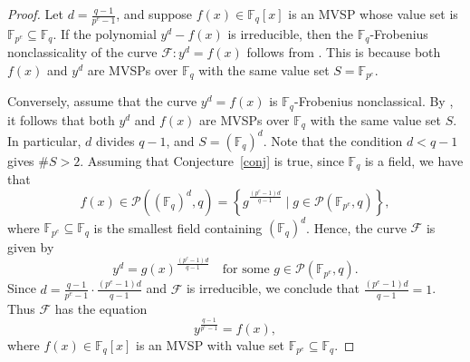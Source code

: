 \documentclass[11pt]{amsart}
\theoremstyle{definition}
\theoremstyle{remark}
\begin{document}
\begin{proof}

Let \( d = \frac{q - 1}{p^e - 1} \), and suppose \( f(x) \in \mathbb{F}_{q}[x] \) is an MVSP whose value set is \( \mathbb{F}_{p^e}     \subseteq  \mathbb{F}_{q} \). If the polynomial \( y^d - f(x) \) is irreducible, then the \(\mathbb{F}_{q}\)-Frobenius nonclassicality of the curve \( \mathcal{F}: y^d = f(x) \) follows from \cite[Corollary 3.5]{Bor0}. This is because both \( f(x) \) and \( y^d \) are MVSPs over \( \mathbb{F}_{q} \) with the same value set \( S = \mathbb{F}_{p^e} \).

Conversely, assume that the curve \( y^d = f(x) \) is \(\mathbb{F}_{q}\)-Frobenius nonclassical. By \cite[Corollary 3.5]{Bor0}, it follows that both \( y^d \) and \( f(x) \) are MVSPs over \( \mathbb{F}_{q} \) with the same value set \( S \). In particular,  \( d \) divides \( q - 1 \), and \( S = \left( \mathbb{F}_{q} \right)^d \). Note that the condition $d<q-1$ gives $\#S>2$. Assuming that Conjecture~\ref{conj} is true,  since \( \mathbb{F}_{q} \) is a field, we have that
\[
f(x) \in \mathcal{P}\left( \left( \mathbb{F}_{q} \right)^d, q \right) = \left\{ g^{\frac{\left( p^e - 1 \right) d}{q - 1}} \mid g \in \mathcal{P}\left( \mathbb{F}_{p^e}, q \right) \right\},
\]
where \( \mathbb{F}_{p^e} \subseteq \mathbb{F}_{q} \) is the smallest field containing \( \left( \mathbb{F}_{q} \right)^d \). Hence, the curve \( \mathcal{F} \) is given by
\[
y^d = g(x)^{\frac{\left( p^e - 1 \right) d}{q - 1}}  \quad \text{for some } g \in \mathcal{P}\left( \mathbb{F}_{p^e}, q \right).
\]
Since \( d = \frac{q - 1}{p^e - 1} \cdot \frac{\left( p^e - 1 \right) d}{q - 1} \) and \( \mathcal{F} \) is irreducible, we conclude that \( \frac{\left( p^e - 1 \right) d}{q- 1} = 1 \). Thus  \( \mathcal{F} \) has the equation
\[
y^{\frac{q - 1}{p^e - 1}} = f(x),
\]
where \( f(x) \in \mathbb{F}_{q}[x] \) is an MVSP with value set \(  \mathbb{F}_{p^e} \subseteq \mathbb{F}_{q} \). 


\end{proof}
\end{document}
